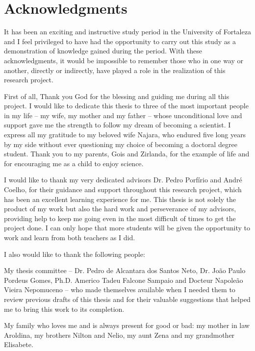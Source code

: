 \chapter*{Acknowledgments} 



It has been an exciting and instructive study period in the University of Fortaleza and I
feel privileged to have had the opportunity to carry out this study as a demonstration of
knowledge gained during the period. With these acknowledgments, it would be impossible to remember those who in one way or another, directly or indirectly, have played a role in the realization of this research project. 

First of all, Thank you God for the blessing and guiding me during all this project. I would like to dedicate this thesis to three of the most important people in my life
– my wife, my mother and my father – whose unconditional love and support gave me the
strength to follow my dream of becoming a scientist. I express all my gratitude to my beloved wife Najara, who endured five long years by my side without ever questioning my choice of becoming a doctoral degree student. Thank you to my parents, Gois and Zirlanda,  for the example of life and for encouraging me as a child to enjoy science.

I would like to thank my very dedicated advisors Dr. Pedro Porfírio and André Coelho, for their guidance and support throughout this research project, which has been an excellent
learning experience for me. This thesis is not solely the product of my work but also the hard work and perseverance of my advisors, providing help to keep me going even in the most difficult of times to get the project done. I can only hope that more students will be given the opportunity to work and learn from both teachers as I did.

I also would like to thank the following people:

My thesis committee – Dr. Pedro de Alcantara dos Santos Neto, Dr. João Paulo Pordeus Gomes, Ph.D. Americo Tadeu Falcone Sampaio and Docteur Napoleão Vieira Nepomuceno – who made themselves available when I needed them to review previous drafts of this thesis and for their valuable suggestions that helped me to bring this work to its completion.

My family who loves me and is always present for good or bad: my mother in law Aroldina, my brothers Nilton and Nelio, my aunt Zena and my grandmother Elisabete.

